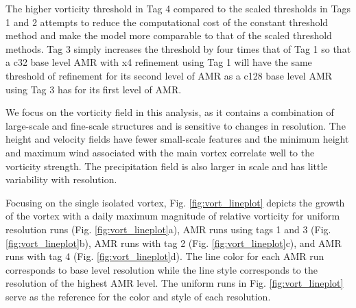 The higher vorticity threshold in Tag 4 compared to the scaled thresholds in 
Tags 1 and 2 attempts to reduce the computational cost of the constant threshold
method and make the model more comparable to that of the scaled threshold methods. Tag 3 simply increases 
the threshold by four times that of Tag 1 so that a c32 base level AMR with x4 refinement
using Tag 1 will have the same threshold of refinement for its second level of AMR as a c128 base level
AMR using Tag 3 has for its first level of AMR.

We focus on the vorticity field in this analysis, as it contains a combination of large-scale 
and fine-scale structures and is sensitive to changes in resolution. The height and
velocity fields have fewer small-scale features and the minimum height and maximum wind
associated with the main vortex correlate well to the vorticity strength. The precipitation
field is also larger in scale and has little variability with resolution.

Focusing on the single isolated vortex, Fig. \ref{fig:vort_lineplot} depicts the growth of the vortex with a daily
maximum magnitude of relative vorticity for uniform resolution runs (Fig.
\ref{fig:vort_lineplot}a), AMR runs using tags 1 and 3 (Fig. \ref{fig:vort_lineplot}b), AMR runs 
with tag 2 (Fig. \ref{fig:vort_lineplot}c), and AMR runs with tag 4 (Fig. \ref{fig:vort_lineplot}d).
The line color for each AMR run corresponds to base level resolution while the line style corresponds
to the resolution of the highest AMR level. The uniform runs in Fig. \ref{fig:vort_lineplot} serve as the
reference for the color and style of each resolution. 


